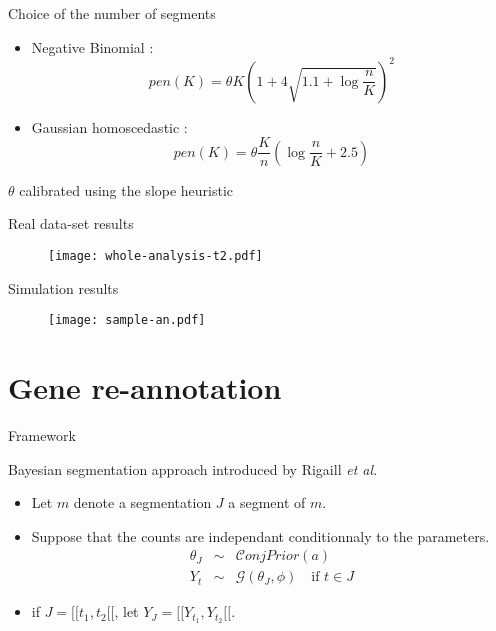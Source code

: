 \documentclass[a4paper]{beamer}
\begin{document}
\begin{frame}{Choice of the number of segments}

\vspace{0.5cm}
	\begin{itemize}
		\item Negative Binomial : $$pen(K)=\theta K \left(1+4\sqrt{1.1+\log\frac{n}{K}}\right)^2 $$
		\item Gaussian homoscedastic \cite{lebarbier_detecting_2005} :  $$pen(K)=\theta \frac{K}{n} \left(\log\dfrac{n}{K} +2.5\right) $$ 
	\end{itemize}
	\vspace{0.3cm}
\begin{center}
$\theta$ calibrated using the slope heuristic \cite{Arl_Mas-pente}
\end{center}
\end{frame}

\begin{frame}{Real data-set results}
 \begin{figure}
  \texttt{[image: whole-analysis-t2.pdf]}
 \end{figure}
\end{frame}

\begin{frame}{Simulation results}
 \begin{figure}
  \texttt{[image: sample-an.pdf]}
 \end{figure}
\end{frame}

\section{Gene re-annotation}


\begin{frame}{Framework}
  \begin{center}
    Bayesian segmentation approach introduced by Rigaill \textit{et al.} \cite{rigaill_exact_2011}
  \end{center}
  
  \vspace{0.2cm}  
  \begin{itemize}
    \item Let $m$ denote a segmentation $J$ a segment of $m$.
    \item Suppose that the counts are independant conditionnaly to the parameters.
      \begin{eqnarray*}
        \theta_J & \sim& \mathcal{C}onjPrior(a)\\
        Y_t & \sim& \mathcal{G}(\theta_J,\phi) \quad \text{if } t\in J
      \end{eqnarray*}
    \item if $J=[\![t_1,t_2[\![$, let $Y_J=[\![Y_{t_1},Y_{t_2}[\![$.
  \end{itemize}
\end{frame}
\end{document}
